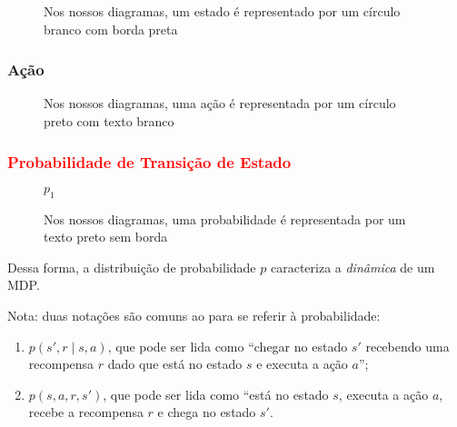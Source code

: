 \documentclass{article}
\begin{document}
                \begin{figure}[ht]
                    \centering
                    \caption{Nos nossos diagramas, um estado é representado por um círculo branco com borda preta}
                    \label{diag:state-node}
                \end{figure}
                
            \subsubsection{Ação}
            
                \begin{figure}[ht]
                    \centering
                    \caption{Nos nossos diagramas, uma ação é representada por um círculo preto com texto branco}
                    \label{diag:action-node}
                \end{figure}
                
            \subsubsection{\textcolor{red}{Probabilidade de Transição de Estado}}
            
                \begin{figure}[ht]
                    \centering
                    $p_1$\\
                    \caption{Nos nossos diagramas, uma probabilidade é representada por um texto preto sem borda}
                    \label{diag:prob-label}
                \end{figure}
            
                Dessa forma, a distribuição de probabilidade $p$ caracteriza a \emph{dinâmica} de um MDP.
            
                Nota: duas notações são comuns ao para se referir à probabilidade:
                
                \begin{enumerate}
                    \item $p(s', r \mid s, a)$, que pode ser lida como ``chegar no estado $s'$ recebendo uma recompensa $r$ dado que está no estado $s$ e executa a ação $a$'';
                    \item $p(s, a, r, s')$, que pode ser lida como ``está no estado $s$, executa a ação $a$, recebe a recompensa $r$ e chega no estado $s'$.
                \end{enumerate}
                
\end{document}
